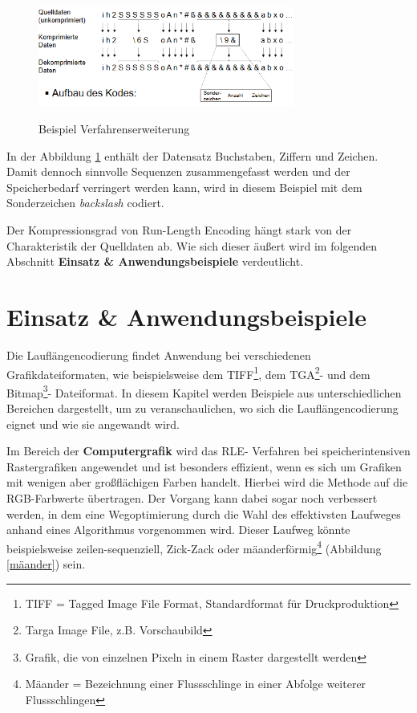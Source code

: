 \documentclass[11pt,a4paper,ngerman]{report}
\begin{document}
  		   \begin{figure} [H]
  		  	\begin{center}
  		  		\includegraphics[width=0.75\textwidth]{alpha_ziffer.png}
  		  		\caption{Beispiel Verfahrenserweiterung}
  		  		\cite[Seite 62]{Lange2021}
  		  		\label{Lange}
  		  	\end{center}
  		  \end{figure}
  		  
  		  In der Abbildung \ref{Lange} enthält der Datensatz Buchstaben, Ziffern und  Zeichen. Damit dennoch sinnvolle Sequenzen zusammengefasst werden und der Speicherbedarf verringert werden kann, wird in diesem Beispiel mit dem Sonderzeichen \textit{backslash} codiert.
  		  
  		  Der Kompressionsgrad von Run-Length Encoding hängt stark von der Charakteristik der Quelldaten ab. \cite[Seite 62]{Lange2021} Wie sich dieser äußert wird im folgenden Abschnitt  \textbf{Einsatz \& Anwendungsbeispiele} verdeutlicht.
  	
		\section{Einsatz \& Anwendungsbeispiele}
		Die Lauflängencodierung findet Anwendung bei verschiedenen Grafikdateiformaten, wie beispielsweise dem TIFF\footnote{TIFF = Tagged Image File Format, Standardformat für Druckproduktion}, dem TGA\footnote{Targa Image File, z.B. Vorschaubild}- und dem Bitmap\footnote{Grafik, die von einzelnen Pixeln in einem Raster dargestellt werden}- Dateiformat. In diesem Kapitel werden  Beispiele aus unterschiedlichen Bereichen dargestellt, um zu veranschaulichen, wo sich die Lauflängencodierung eignet und wie sie angewandt wird.
	
		Im Bereich der \textbf{Computergrafik} wird das RLE- Verfahren bei speicherintensiven Rastergrafiken angewendet und ist besonders effizient, wenn es sich um Grafiken mit wenigen aber großflächigen Farben handelt. Hierbei wird die Methode auf die RGB-Farbwerte übertragen. Der Vorgang kann dabei sogar noch verbessert werden, in dem eine Wegoptimierung durch die Wahl des effektivsten Laufweges anhand eines Algorithmus vorgenommen wird.  Dieser Laufweg könnte beispielsweise zeilen-sequenziell, Zick-Zack oder mäanderförmig\footnote{Mäander = Bezeichnung einer Flussschlinge in einer Abfolge weiterer Flussschlingen } (Abbildung \ref{mäander}) sein.
		
\end{document}

